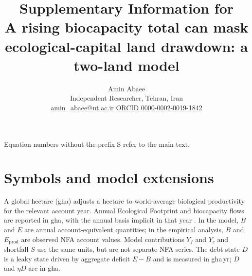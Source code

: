 \documentclass[11pt,a4paper]{article}
\title{Supplementary Information for\\[4pt]
\large A rising biocapacity total can mask ecological-capital land drawdown: a two-land model}
\author{Amin Abaee\\ \small Independent Researcher, Tehran, Iran\\ \small \href{mailto:amin_abaee@ut.ac.ir}{amin\_abaee@ut.ac.ir} \quad\href{https://orcid.org/0000-0002-0019-1842}{ORCID 0000-0002-0019-1842}}
\date{}
\begin{document}
\maketitle

\noindent Equation numbers without the prefix S refer to the main text.

\section{Symbols and model extensions}\label{si:symbols}

A global hectare (gha) adjusts a hectare to world-average biological productivity for the relevant account year. Annual Ecological Footprint and biocapacity flows are reported in gha, with the annual basis implicit in that year \citep{GFNStandards2009,GFNGuidebook2019}. In the model, $B$ and $E$ are annual account-equivalent quantities; in the empirical analysis, $B$ and $E_{\mathrm{prod}}$ are observed NFA account values. Model contributions $Y_f$ and $Y_c$ and shortfall $S$ use the same units, but are not separate NFA series. The debt state $D$ is a leaky state driven by aggregate deficit $E-B$ and is measured in gha\,yr; $\dot D$ and $\eta D$ are in gha.
\end{document}
